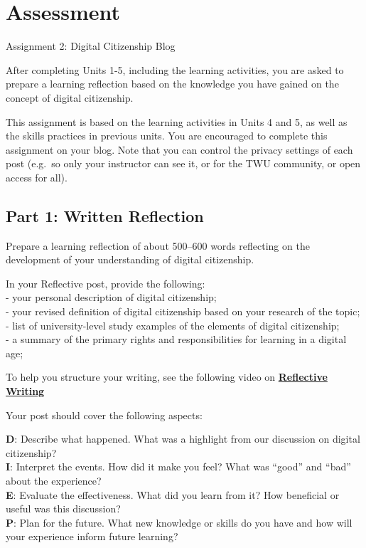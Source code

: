 \documentclass[
]{book}
\theoremstyle{definition}
\theoremstyle{definition}
\theoremstyle{definition}
\theoremstyle{definition}
\theoremstyle{remark}
\begin{document}
\hypertarget{assessment-2}{%
\section*{Assessment}\label{assessment-2}}

\begin{assessment}
{Assignment 2: Digital Citizenship Blog}

After completing Units 1-5, including the learning activities, you are asked to prepare a learning reflection based on the knowledge you have gained on the concept of digital citizenship.

This assignment is based on the learning activities in Units 4 and 5, as well as the skills practices in previous units. You are encouraged to complete this assignment on your blog. Note that you can control the privacy settings of each post (e.g.~so only your instructor can see it, or for the TWU community, or open access for all).

\hypertarget{part-1-written-reflection}{%
\subsection*{Part 1: Written Reflection}\label{part-1-written-reflection}}

Prepare a learning reflection of about 500--600 words reflecting on the development of your understanding of digital citizenship.

In your Reflective post, provide the following:\\
- your personal description of digital citizenship;\\
- your revised definition of digital citizenship based on your research of the topic;\\
- list of university-level study examples of the elements of digital citizenship;\\
- a summary of the primary rights and responsibilities for learning in a digital age;

To help you structure your writing, see the following video on \href{https://www.youtube.com/watch?v=SntBj0FIApw}{\textbf{Reflective Writing}}

Your post should cover the following aspects:

\textbf{D}: Describe what happened. What was a highlight from our discussion on digital citizenship?\\
\textbf{I}: Interpret the events. How did it make you feel? What was ``good'' and ``bad'' about the experience?\\
\textbf{E}: Evaluate the effectiveness. What did you learn from it? How beneficial or useful was this discussion?\\
\textbf{P}: Plan for the future. What new knowledge or skills do you have and how will your experience inform future learning?


\end{assessment}
\end{document}
